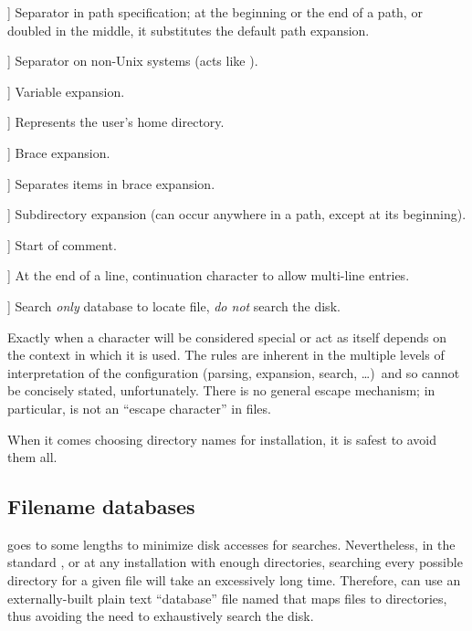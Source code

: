 \documentclass{article}
\begin{document}
\newcommand{\CODE}[1]{\makebox[3em][l]{\code{#1}}}
\begin{ttdescription}
\item[\CODE{:}] Separator in path specification; at the beginning or
  the end of a path, or doubled in the middle, it substitutes the
  default path expansion.\par
\item[\CODE{;}] Separator on non-Unix systems (acts like \code{:}).
\item[\CODE{\$}] Variable expansion.
\item[\CODE{\string~}] Represents the user's home directory.
\item[\CODE{\char`\{...\char`\}}] Brace expansion.
\item[\CODE{,}] Separates items in brace expansion.
\item[\CODE{//}] Subdirectory expansion (can occur anywhere in
    a path, except at its beginning).
\item[\CODE{\%}] Start of comment.
\item[\CODE{\bs}] At the end of a line, continuation character to allow
    multi-line entries.
\item[\CODE{!!}] Search \emph{only} database to locate file, \emph{do
    not} search the disk.
\end{ttdescription}

Exactly when a character will be considered special or act as itself
depends on the context in which it is used. The rules are inherent in
the multiple levels of interpretation of the configuration (parsing,
expansion, search, \ldots)\ and so cannot be concisely stated,
unfortunately. There is no general escape mechanism; in particular,
\samp{\bs} is not an ``escape character'' in  files.

When it comes choosing directory names for installation, it is safest to
avoid them all.

\subsection{Filename databases}
\label{sec:filename-database}

\KPS{} goes to some lengths to minimize disk accesses for searches.
Nevertheless, in the standard \TL, or at any installation with enough
directories, searching every possible directory for a given file will
take an excessively long time. Therefore, \KPS{} can use an
externally-built plain text ``database'' file named  that
maps files to directories, thus avoiding the need to exhaustively search
the disk.
\end{document}
